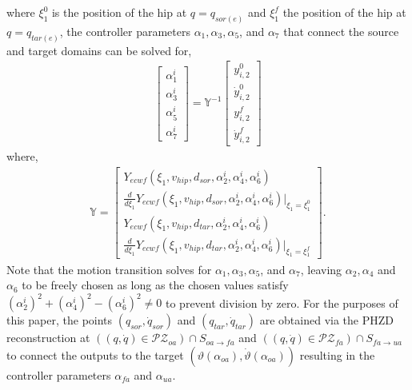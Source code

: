 where $\xi^{0}_{1}$ is the position of the hip at $q = q_{sor(e)}$ and $\xi^{f}_{1}$ the position of the hip at $q = q_{tar(e)}$, the controller parameters $\alpha_{1},\alpha_{3},\alpha_{5}$, and $\alpha_{7}$ that connect the source and target domains can be solved for,
\begin{align}
\begin{bmatrix}
\alpha^{i}_{1} \\
\alpha^{i}_{3} \\
\alpha^{i}_{5} \\
\alpha^{i}_{7}
\end{bmatrix}
=
\mathbb{Y}^{-1}
\begin{bmatrix}
y^{0}_{i,2} \\
\dot{y}^{0}_{i,2} \\
y^{f}_{i,2} \\
\dot{y}^{f}_{i,2}
\end{bmatrix}
\end{align}
where,
\begin{align}
 \mathbb{Y} = 
 \begin{bmatrix}
  Y_{ecwf}(\xi_{1},v_{hip},d_{sor},\alpha^{i}_{2},\alpha^{i}_{4},\alpha^{i}_{6}) \\
  \frac{d}{d\xi_{1}} Y_{ecwf}(\xi_{1},v_{hip},d_{sor},\alpha^{i}_{2},\alpha^{i}_{4},\alpha^{i}_{6})\Big|_{\xi_{1}=\xi^{0}_{1}} \\
  Y_{ecwf}(\xi_{1},v_{hip},d_{tar},\alpha^{i}_{2},\alpha^{i}_{4},\alpha^{i}_{6}) \\
  \frac{d}{d\xi_{1}} Y_{ecwf}(\xi_{1},v_{hip},d_{tar},\alpha^{i}_{2},\alpha^{i}_{4},\alpha^{i}_{6})\Big|_{\xi_{1}=\xi^{f}_{1}}
 \end{bmatrix}.
\end{align}
Note that the motion transition solves for $\alpha_{1},\alpha_{3},\alpha_{5}$, and $\alpha_{7}$, leaving $\alpha_{2},\alpha_{4}$ and $\alpha_{6}$ to be freely chosen as long as the chosen values satisfy $(\alpha^{i}_{2})^{2}+(\alpha^{i}_{4})^{2}-(\alpha^{i}_{6})^{2} \neq 0$ to prevent division 
by zero. For the purposes of this paper, the points $(q_{sor},\dot{q}_{sor})$ and $(q_{tar},\dot{q}_{tar})$ are 
obtained via the PHZD reconstruction at $((q,\dot{q}) \in \mathcal{PZ}_{oa}) \cap S_{oa \rightarrow fa}$ and $((q,\dot{q}) \in \mathcal{PZ}_{fa}) \cap S_{fa \rightarrow ua}$ to connect the outputs to the target $(\vartheta(\alpha_{oa}),\dot{\vartheta}(\alpha_{oa}))$ resulting in the controller parameters $\alpha_{fa}$ and $\alpha_{ua}$.
